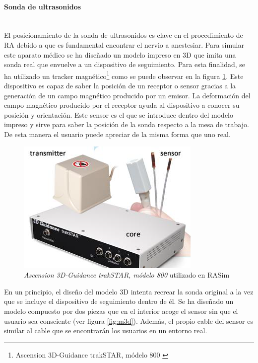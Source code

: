 \paragraph{Sonda de ultrasonidos}\mbox{}\\

El posicionamiento de la sonda de ultrasonidos es clave en el procedimiento de \ac{RA} debido a que es fundamental encontrar el nervio a anestesiar. Para simular este aparato médico se ha diseñado un modelo impreso en 3D que imita una sonda real que envuelve a un dispositivo de seguimiento. Para esta finalidad, se ha utilizado un \ac{tracker} magnético\footnote{ Ascension 3D-Guidance trakSTAR, módelo 800 \cite{Ascension}} como se puede observar en la figura \ref{fig:tracker}. 
Este dispositivo es capaz de saber la posición de un receptor o sensor gracias a la generación de un campo magnético producido por un emisor. La deformación del campo magnético producido por el receptor ayuda al dispositivo a conocer su posición y orientación. Este sensor es el que se introduce dentro del modelo impreso y sirve para saber la posición de la sonda respecto a la mesa de trabajo. De esta manera el usuario puede apreciar de la misma forma que uno real.

\begin{figure}[h]
    \centering
    \includegraphics{IMG/tracker.png}
    \caption{\emph{Ascension 3D-Guidance trakSTAR, módelo 800} \cite{Ascension} utilizado en \ac{RASim}}
    \label{fig:tracker}
\end{figure}

En un principio, el diseño del modelo 3D intenta recrear la sonda original a la vez que se incluye el dispositivo de seguimiento dentro de él. Se ha diseñado un modelo compuesto por dos piezas que en el interior acoge el sensor sin que el usuario sea consciente (ver figura \ref{fig:m3d}). Además, el propio cable del sensor es similar al cable que se encontrarán los usuarios en un entorno real.

